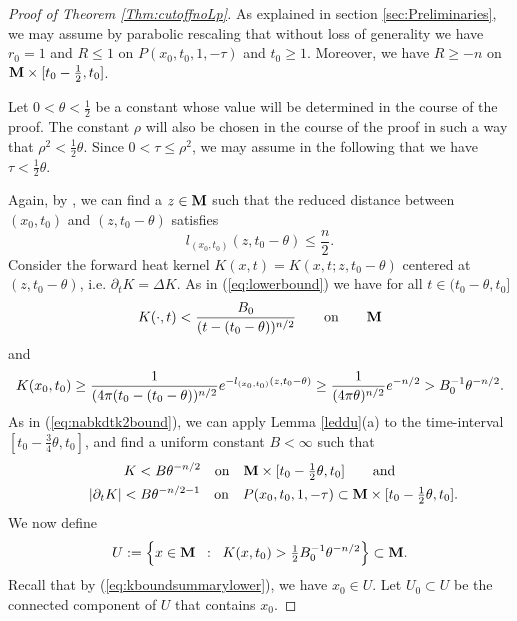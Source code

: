 \documentclass[11pt]{amsart}
\numberwithin{equation}{section}
\def\M{{\bf M}}
\numberwithin{equation}{section}
\begin{document}
\begin{proof}[Proof of Theorem \ref{Thm:cutoffnoLp}]
As explained in section \ref{sec:Preliminaries}, we may assume by parabolic rescaling that without loss of generality we have $r_0 = 1$ and $R \leq 1$ on $P(x_0, t_0, 1, -\tau)$  and $t_0 \geq 1$.
Moreover, we have $R \geq -n$ on $\M \times [t_0 - \frac12, t_0]$.

Let $0 < \theta < \frac12$ be a constant whose value will be determined in the course of the proof.
The constant $\rho$ will also be chosen in the course of the proof in such a way that $\rho^2 < \tfrac12 \theta$.
Since $0 < \tau \leq \rho^2$, we may assume in the following that we have $\tau < \frac12 \theta$.

Again, by \cite[end of 7.1]{P:1}, we can find a $z \in \M$ such that the reduced distance between $(x_0, t_0)$ and $(z, t_0 - \theta)$ satisfies
\[ l_{(x_0, t_0)} (z, t_0 - \theta ) \leq  \frac{n}2. \]
Consider the forward heat kernel $K(x,t) = K(x,t; z, t_0 - \theta)$ centered at $(z, t_0 - \theta)$, i.e. $\partial_t K = \Delta K$.
As in (\ref{eq:lowerbound}) we have for all $t \in (t_0 - \theta, t_0]$
\[
 K(\cdot, t) < \frac{B_0}{(t-(t_0 - \theta))^{n/2}} \qquad \text{on} \qquad \M
\]
and
\begin{equation} \label{eq:kboundsummarylower}
K(x_0, t_0) \geq \frac1{(4\pi ( t_0 - (t_0 - \theta))^{n/2}} e^{-l_{(x_0, t_0)} (z, t_0 - \theta)} \\
\geq  \frac1{(4\pi  \theta)^{n/2}} e^{-n/2} > B_0^{-1} \theta^{-n/2}.
\end{equation}
As in (\ref{eq:nabkdtk2bound}), we can apply Lemma \ref{leddu}(a) to the time-interval $[t_0 -  \frac34 \theta, t_0]$, and find a uniform constant $B < \infty$ such that
\begin{multline} \label{eq:dkdtk2nd}
 K < B \theta^{-n/2} \quad \text{on} \quad \M \times [t_0 - \tfrac12 \theta, t_0] \qquad \text{and} \\ \qquad |\partial_t K| < B \theta^{-n/2-1} \quad  \text{on} \quad P(x_0, t_0, 1, -\tau) \subset \M \times [t_0 - \tfrac12 \theta, t_0] .
\end{multline}
We now define 
\[ U := \Big\{ x \in \M \;\; : \;\; K(x,t_0) > \tfrac12 B_0^{-1} \theta^{-n/2} \Big\} \subset \M. \]
Recall that by (\ref{eq:kboundsummarylower}), we have $x_0 \in U$.
Let $U_0 \subset U$ be the connected component of $U$ that contains $x_0$.


\end{proof}
\end{document}
